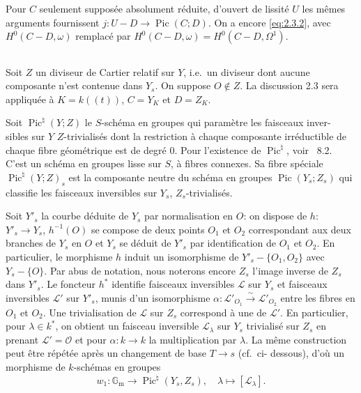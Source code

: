 \documentclass[12pt,a4paper]{article}
\theoremstyle{plain}
\theoremstyle{definition}
\theoremstyle{remark}
\DeclareMathOperator{\Pic}{Pic}
\newcommand{\OO}{\mathcal{O}}
\newcommand{\Gm}{\mathbb{G}_{\mathrm{m}}}
\providecommand{\Gm}{\mathbb{G}_{\mathrm m}}
\begin{document}
Pour $C$ seulement supposée absolument réduite, d'ouvert de lissité $U$ les
mêmes arguments fournissent $j:U-D\to\Pic(C;D)$. On a encore
\eqref{eq:2.3.2}, avec $H^0(C-D,\omega)$ remplacé par
$H^0(C-D,\omega)=H^0(C-D,\Omega^1)$.

\subsection{}

Soit $Z$ un diviseur de Cartier relatif sur $Y$, i.e.\ un diviseur dont aucune
composante n'est contenue dans $Y_s$. On suppose $O\notin Z$. La discussion 2.3
sera appliquée à $K=k((t))$, $C=Y_K$ et $D=Z_K$.

Soit $\Pic^\natural(Y;Z)$ le $S$-schéma en groupes qui paramètre les faisceaux inver-
sibles sur $Y$ $Z$-trivialisés dont la restriction à chaque composante irréductible
de chaque fibre géométrique est de degré $0$. Pour l'existence de $\Pic^\natural$, voir
\cite{Raynaud1}~8.2. C'est un schéma en groupes lisse sur $S$, à fibres connexes.
Sa fibre spéciale $\Pic^\natural(Y;Z)_s$ est la composante neutre du schéma en groupes
$\Pic(Y_s;Z_s)$ qui classifie les faisceaux inversibles sur $Y_s$, $Z_s$-trivialisés.

Soit $Y'_s$ la courbe déduite de $Y_s$ par normalisation en $O$: on dispose de $h$:
$Y'_s\to Y_s$, $h^{-1}(O)$ se compose de deux points $O_1$ et $O_2$ correspondant aux deux
branches de $Y_s$ en $O$ et $Y_s$ se déduit de $Y'_s$ par identification de $O_1$ et $O_2$.
En particulier, le morphisme $h$ induit un isomorphisme de $Y'_s-\{O_1,O_2\}$ avec
$Y_s-\{O\}$. Par abus de notation, nous noterons encore $Z_s$ l'image inverse de $Z_s$
dans $Y'_s$. Le foncteur $h^*$ identifie faisceaux inversibles $\mathscr{L}$ sur $Y_s$ et faisceaux
inversibles $\mathscr{L}'$ sur $Y'_s$, munis d'un isomorphisme
$\alpha:\mathscr{L}'_{O_1}\xrightarrow{\sim}\mathscr{L}'_{O_2}$ entre les fibres en $O_1$ et $O_2$.
Une trivialisation de $\mathscr{L}$ sur $Z_s$ correspond à une de $\mathscr{L}'$. En particulier, pour
$\lambda\in k^*$, on obtient un faisceau inversible $\mathscr{L}_\lambda$ sur $Y_s$ trivialisé sur $Z_s$ en
prenant $\mathscr{L}'=\OO$ et pour $\alpha:k\to k$ la multiplication par $\lambda$. La même
construction peut être répétée après un changement de base $T\to s$ (cf.\ ci-
dessous), d'où un morphisme de $k$-schémas en groupes
\begin{equation}\label{eq:2.4.1}
w_1:\Gm\to\Pic^\natural(Y_s,Z_s),\quad\lambda\mapsto[\mathscr{L}_\lambda].
\end{equation}
\end{document}
